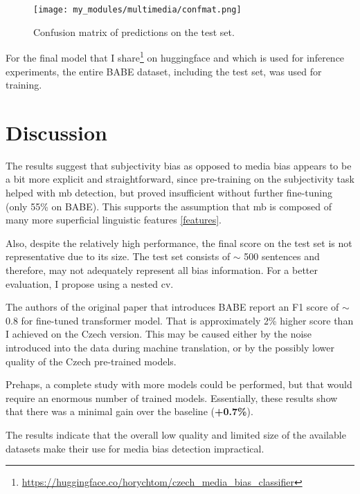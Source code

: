 \begin{figure}[h]
  \texttt{[image: my\_modules/multimedia/confmat.png]}
  \caption{Confusion matrix of predictions on the test set.}
  \label{fig:confmat}
\end{figure}

For the final model that I share\footnote{\url{https://huggingface.co/horychtom/czech_media_bias_classifier}} on huggingface and which is used for inference experiments, the entire BABE dataset, including the test set, was used for training.

\section{Discussion}
The results suggest that subjectivity bias as opposed to media bias appears to be a bit more explicit and straightforward, since pre-training on the subjectivity task helped with \gls{mb} detection, but proved insufficient without further fine-tuning (only 55\% on BABE). This supports the assumption that \gls{mb} is composed of many more superficial linguistic features \ref{features}.

Also, despite the relatively high performance, the final score on the test set is not representative due to its size. The test set consists of $\sim$ 500 sentences and therefore, may not adequately represent all bias information. For a better evaluation, I propose using a nested \gls{cv}.

The authors of the original paper that introduces BABE \cite{spinde2021neural} report an F1 score of $\sim$ 0.8 for fine-tuned transformer model. That is approximately 2\% higher score than I achieved on the Czech version. This may be caused either by the noise introduced into the data during machine translation, or by the possibly lower quality of the Czech pre-trained models.

Prehaps, a complete study with more models could be performed, but that would require an enormous number of trained models. Essentially, these results show that there was a minimal gain over the baseline (\textbf{+0.7\%}).

The results indicate that the overall low quality and limited size of the available datasets make their use for media bias detection impractical.






